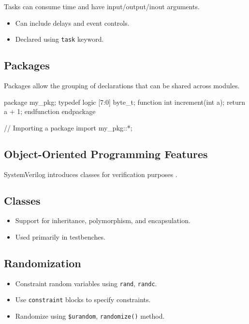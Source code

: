 Tasks can consume time and have input/output/inout arguments.

\begin{itemize}
    \item Can include delays and event controls.
    \item Declared using \texttt{task} keyword.
\end{itemize}

\subsection{Packages}
Packages allow the grouping of declarations that can be shared across modules.
\begin{verilogcode}
package my_pkg;
    typedef logic [7:0] byte_t;
    function int increment(int a);
        return a + 1;
    endfunction
endpackage

// Importing a package
import my_pkg::*;
\end{verilogcode}

\subsection{Object-Oriented Programming Features}
SystemVerilog introduces classes for verification purposes \cite{stapko2008advanced}.

\subsection{Classes}
\begin{itemize}
    \item Support for inheritance, polymorphism, and encapsulation.
    \item Used primarily in testbenches.
\end{itemize}

\subsection{Randomization}
\begin{itemize}
    \item Constraint random variables using \texttt{rand}, \texttt{randc}.
    \item Use \texttt{constraint} blocks to specify constraints.
    \item Randomize using \texttt{\$urandom}, \texttt{randomize()} method.
\end{itemize}

